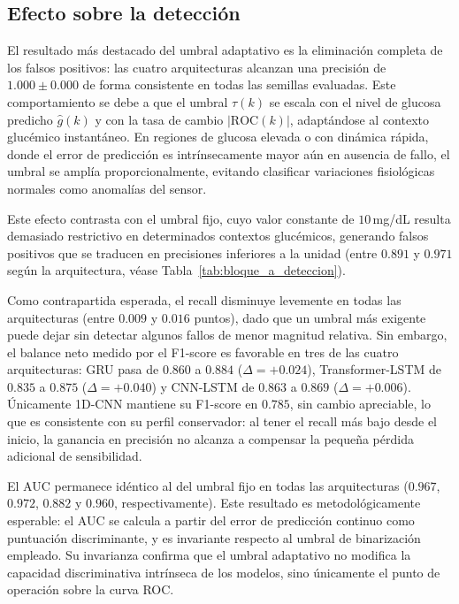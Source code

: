 \documentclass{report}
\begin{document}
\subsection*{Efecto sobre la detección}

El resultado más destacado del umbral adaptativo es la eliminación completa de los falsos positivos: las cuatro arquitecturas alcanzan una precisión de $1.000 \pm 0.000$ de forma consistente en todas las semillas evaluadas. Este comportamiento se debe a que el umbral $\tau(k)$ se escala con el nivel de glucosa predicho $\hat{g}(k)$ y con la tasa de cambio $|\text{ROC}(k)|$, adaptándose al contexto glucémico instantáneo. En regiones de glucosa elevada o con dinámica rápida, donde el error de predicción es intrínsecamente mayor aún en ausencia de fallo, el umbral se amplía proporcionalmente, evitando clasificar variaciones fisiológicas normales como anomalías del sensor.

Este efecto contrasta con el umbral fijo, cuyo valor constante de $10$\,mg/dL resulta demasiado restrictivo en determinados contextos glucémicos, generando falsos positivos que se traducen en precisiones inferiores a la unidad (entre $0.891$ y $0.971$ según la arquitectura, véase Tabla~\ref{tab:bloque_a_deteccion}).

Como contrapartida esperada, el recall disminuye levemente en todas las arquitecturas (entre $0.009$ y $0.016$ puntos), dado que un umbral más exigente puede dejar sin detectar algunos fallos de menor magnitud relativa. Sin embargo, el balance neto medido por el F1-score es favorable en tres de las cuatro arquitecturas: GRU pasa de $0.860$ a $0.884$ ($\Delta = +0.024$), Transformer-LSTM de $0.835$ a $0.875$ ($\Delta = +0.040$) y CNN-LSTM de $0.863$ a $0.869$ ($\Delta = +0.006$). Únicamente 1D-CNN mantiene su F1-score en $0.785$, sin cambio apreciable, lo que es consistente con su perfil conservador: al tener el recall más bajo desde el inicio, la ganancia en precisión no alcanza a compensar la pequeña pérdida adicional de sensibilidad.

El AUC permanece idéntico al del umbral fijo en todas las arquitecturas ($0.967$, $0.972$, $0.882$ y $0.960$, respectivamente). Este resultado es metodológicamente esperable: el AUC se calcula a partir del error de predicción continuo como puntuación discriminante, y es invariante respecto al umbral de binarización empleado. Su invarianza confirma que el umbral adaptativo no modifica la capacidad discriminativa intrínseca de los modelos, sino únicamente el punto de operación sobre la curva ROC.
\end{document}
